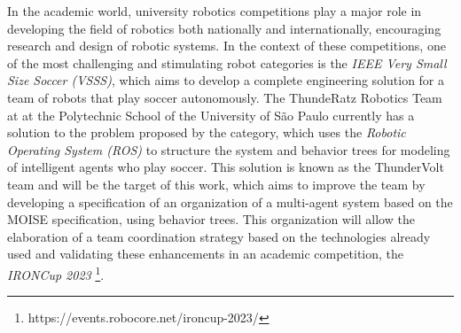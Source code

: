 In the academic world, university robotics competitions play a major role in developing the field of robotics both nationally and internationally, encouraging research and design of robotic systems. In the context of these competitions, one of the most challenging and stimulating robot categories is the \textit{IEEE Very Small Size Soccer (VSSS)}, which aims to develop a complete engineering solution for a team of robots that play soccer autonomously. The ThundeRatz Robotics Team at at the Polytechnic School of the University of São Paulo currently has a solution to the problem proposed by the category, which uses the \textit{Robotic Operating System (ROS)} to structure the system and behavior trees for modeling of intelligent agents who play soccer. This solution is known as the ThunderVolt team and will be the target of this work, which aims to improve the team by developing a specification of an organization of a multi-agent system based on the MOISE specification, using behavior trees. This organization will allow the elaboration of a team coordination strategy based on the technologies already used and validating these enhancements in an academic competition, the \textit{IRONCup 2023} \footnote{https://events.robocore.net/ironcup-2023/}.
